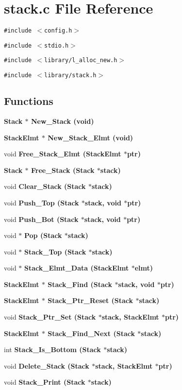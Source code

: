 \section{stack.c File Reference}
\label{stack_8c}
{\tt \#include $<$config.h$>$}\par
{\tt \#include $<$stdio.h$>$}\par
{\tt \#include $<$library/l\_\-alloc\_\-new.h$>$}\par
{\tt \#include $<$library/stack.h$>$}\par
\subsection*{Functions}
\begin{CompactItemize}
\item 
\bf{Stack} $\ast$ \bf{New\_\-Stack} (void)
\item 
\bf{Stack\-Elmt} $\ast$ \bf{New\_\-Stack\_\-Elmt} (void)
\item 
void \bf{Free\_\-Stack\_\-Elmt} (\bf{Stack\-Elmt} $\ast$ptr)
\item 
\bf{Stack} $\ast$ \bf{Free\_\-Stack} (\bf{Stack} $\ast$\bf{stack})
\item 
void \bf{Clear\_\-Stack} (\bf{Stack} $\ast$\bf{stack})
\item 
void \bf{Push\_\-Top} (\bf{Stack} $\ast$\bf{stack}, void $\ast$ptr)
\item 
void \bf{Push\_\-Bot} (\bf{Stack} $\ast$\bf{stack}, void $\ast$ptr)
\item 
void $\ast$ \bf{Pop} (\bf{Stack} $\ast$\bf{stack})
\item 
void $\ast$ \bf{Stack\_\-Top} (\bf{Stack} $\ast$\bf{stack})
\item 
void $\ast$ \bf{Stack\_\-Elmt\_\-Data} (\bf{Stack\-Elmt} $\ast$elmt)
\item 
\bf{Stack\-Elmt} $\ast$ \bf{Stack\_\-Find} (\bf{Stack} $\ast$\bf{stack}, void $\ast$ptr)
\item 
\bf{Stack\-Elmt} $\ast$ \bf{Stack\_\-Ptr\_\-Reset} (\bf{Stack} $\ast$\bf{stack})
\item 
void \bf{Stack\_\-Ptr\_\-Set} (\bf{Stack} $\ast$\bf{stack}, \bf{Stack\-Elmt} $\ast$ptr)
\item 
\bf{Stack\-Elmt} $\ast$ \bf{Stack\_\-Find\_\-Next} (\bf{Stack} $\ast$\bf{stack})
\item 
int \bf{Stack\_\-Is\_\-Bottom} (\bf{Stack} $\ast$\bf{stack})
\item 
void \bf{Delete\_\-Stack} (\bf{Stack} $\ast$\bf{stack}, \bf{Stack\-Elmt} $\ast$ptr)
\item 
void \bf{Stack\_\-Print} (\bf{Stack} $\ast$\bf{stack})
\end{CompactItemize}

